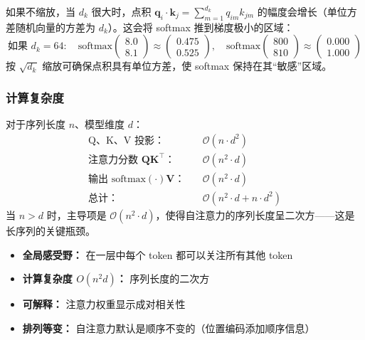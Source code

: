 如果不缩放，当 $d_k$ 很大时，点积 $\mathbf{q}_i \cdot \mathbf{k}_j = \sum_{m=1}^{d_k} q_{im} k_{jm}$ 的幅度会增长（单位方差随机向量的方差为 $d_k$）。这会将 softmax 推到梯度极小的区域：
\begin{equation}
\text{如果 } d_k = 64: \quad \text{softmax}\begin{pmatrix} 8.0 \\ 8.1 \end{pmatrix} \approx \begin{pmatrix} 0.475 \\ 0.525 \end{pmatrix}, \quad \text{softmax}\begin{pmatrix} 800 \\ 810 \end{pmatrix} \approx \begin{pmatrix} 0.000 \\ 1.000 \end{pmatrix}
\end{equation}
按 $\sqrt{d_k}$ 缩放可确保点积具有单位方差，使 softmax 保持在其``敏感''区域。

\subsubsection{计算复杂度}

对于序列长度 $n$、模型维度 $d$：
\begin{align}
\text{Q、K、V 投影：} \quad &\mathcal{O}(n \cdot d^2) \\
\text{注意力分数 } \mathbf{Q}\mathbf{K}^\top：\quad &\mathcal{O}(n^2 \cdot d) \\
\text{输出 softmax}(\cdot)\mathbf{V}：\quad &\mathcal{O}(n^2 \cdot d) \\
\textbf{总计：} \quad &\mathcal{O}(n^2 \cdot d + n \cdot d^2)
\end{align}
当 $n > d$ 时，主导项是 $\mathcal{O}(n^2 \cdot d)$，使得自注意力的序列长度呈二次方——这是长序列的关键瓶颈。

\begin{properties}[自注意力的特性]
\begin{itemize}
    \item \textbf{全局感受野：} 在一层中每个 token 都可以关注所有其他 token
    \item \textbf{计算复杂度 $O(n^2 d)$：} 序列长度的二次方
    \item \textbf{可解释：} 注意力权重显示成对相关性
    \item \textbf{排列等变：} 自注意力默认是顺序不变的（位置编码添加顺序信息）
\end{itemize}
\end{properties}

